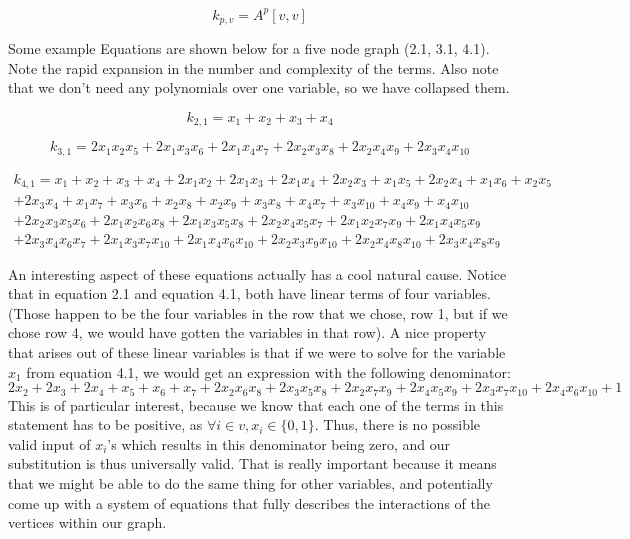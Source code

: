 \documentclass[a4paper,12pt]{article}
\begin{document}
\[k_{p, v} = A^p[v,v]\]

Some example Equations are shown below for a five node graph (2.1, 3.1, 4.1). Note the rapid expansion in the number and complexity of the terms.  Also note that we don't need any polynomials over one variable, so we have collapsed them. 

\[k_{2,1} = x_1 + x_2 + x_3 + x_4\]

\[k_{3,1} = 2x_1x_2x_5 + 2x_1x_3x_6 + 2x_1x_4x_7 + 2x_2x_3x_8 + 2x_2x_4x_9 + 2x_3x_4x_{10}\]

\begin{equation}\begin{aligned} k_{4,1} = x_1 + x_2 + x_3 + x_4 + 2x_1x_2 + 2x_1x_3 + 2x_1x_4 + 2x_2x_3 + x_1x_5 + 2x_2x_4 + x_1x_6 + x_2x_5 \\ + 2x_3x_4 + x_1x_7 + x_3x_6 + x_2x_8 + x_2x_9 + x_3x_8 + x_4x_7 + x_3x_{10} + x_4x_9 + x_4x_{10} \\ + 2x_2x_3x_5x_6 + 2x_1x_2x_6x_8 + 2x_1x_3x_5x_8 + 2x_2x_4x_5x_7 + 2x_1x_2x_7x_9 + 2x_1x_4x_5x_9 \\+ 2x_3x_4x_6x_7 + 2x_1x_3x_7x_{10} + 2x_1x_4x_6x_{10} + 2x_2x_3x_9x_{10} + 2x_2x_4x_8x_{10} + 2x_3x_4x_8x_9 \end{aligned}\end{equation}

An interesting aspect of these equations actually has a cool natural cause.  Notice that in equation 2.1 and equation 4.1, both have linear terms of four variables.  (Those happen to be the four variables in the row that we chose, row 1, but if we chose row 4, we would have gotten the variables in that row). A nice property that arises out of these linear variables is that if we were to solve for the variable \(x_1\) from equation 4.1, we would get an expression with the following denominator: \[2x_2 + 2x_3 + 2x_4 + x_5 + x_6 + x_7 + 2x_2x_6x_8 + 2x_3x_5x_8 + 2x_2x_7x_9 + 2x_4x_5x_9 + 2x_3x_7x_{10} + 2x_4x_6x_{10} + 1\]
This is of particular interest, because we know that each one of the terms in this statement has to be positive, as \(\forall i \in v,  x_i \in \{0, 1\}\).  Thus, there is no possible valid input of \(x_i\)'s which results in this denominator being zero, and our substitution is thus universally valid.  That is really important because it means that we might be able to do the same thing for other variables, and potentially come up with a system of equations that fully describes the interactions of the vertices within our graph.
\end{document}

